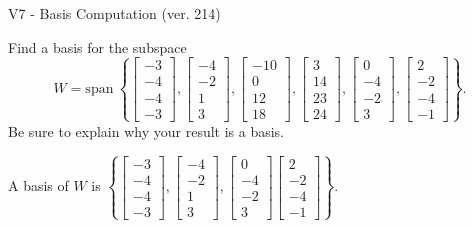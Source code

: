 \begin{exercise}
  \begin{exerciseTitle}V7 - Basis Computation (ver. 214)\end{exerciseTitle}
  \begin{exerciseStatement}
    Find a basis for the subspace 
\[W=\mathrm{span}\ \left\{\left[\begin{array}{r}
-3 \\
-4 \\
-4 \\
-3
\end{array}\right] , \left[\begin{array}{r}
-4 \\
-2 \\
1 \\
3
\end{array}\right] , \left[\begin{array}{r}
-10 \\
0 \\
12 \\
18
\end{array}\right] , \left[\begin{array}{r}
3 \\
14 \\
23 \\
24
\end{array}\right] , \left[\begin{array}{r}
0 \\
-4 \\
-2 \\
3
\end{array}\right] , \left[\begin{array}{r}
2 \\
-2 \\
-4 \\
-1
\end{array}\right]\right\}.\]
 Be sure to explain why your result is a basis.


  \end{exerciseStatement}
  \begin{exerciseAnswer}
   A basis of \(W\) is  \(\left\{\left[\begin{array}{r}
-3 \\
-4 \\
-4 \\
-3
\end{array}\right] , \left[\begin{array}{r}
-4 \\
-2 \\
1 \\
3
\end{array}\right] , \left[\begin{array}{r}
0 \\
-4 \\
-2 \\
3
\end{array}\right] \left[\begin{array}{r}
2 \\
-2 \\
-4 \\
-1
\end{array}\right]\right\}\).
  


  \end{exerciseAnswer}
\end{exercise}
